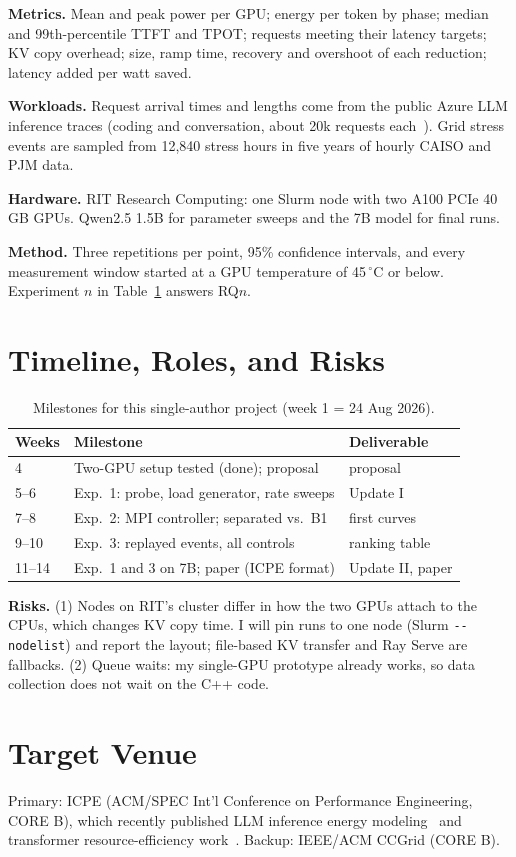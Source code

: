 \documentclass[conference,10pt]{IEEEtran}
\begin{document}
\textbf{Metrics.} Mean and peak power per GPU; energy per token by phase; median and 99th-percentile TTFT and TPOT; requests meeting their latency targets; KV copy overhead; size, ramp time, recovery and overshoot of each reduction; latency added per watt saved.

\textbf{Workloads.} Request arrival times and lengths come from the public Azure LLM inference traces (coding and conversation, about 20k requests each~\cite{patel2024splitwise}). Grid stress events are sampled from 12{,}840 stress hours in five years of hourly CAISO and PJM data.

\textbf{Hardware.} RIT Research Computing: one Slurm node with two A100 PCIe 40\,GB GPUs. Qwen2.5 1.5B for parameter sweeps and the 7B model for final runs.

\textbf{Method.} Three repetitions per point, 95\% confidence intervals, and every measurement window started at a GPU temperature of 45\,$^\circ$C or below. Experiment $n$ in Table~\ref{tab:timeline} answers RQ$n$.

\section{Timeline, Roles, and Risks}
\begin{table}[!h]
\centering\footnotesize
\begin{tabular}{@{}lll@{}}
\toprule
Weeks & Milestone & Deliverable\\
\midrule
4 & Two-GPU setup tested (done); proposal & proposal\\
5--6 & Exp.\ 1: probe, load generator, rate sweeps & Update I\\
7--8 & Exp.\ 2: MPI controller; separated vs.\ B1 & first curves\\
9--10 & Exp.\ 3: replayed events, all controls & ranking table\\
11--14 & Exp.\ 1 and 3 on 7B; paper (ICPE format) & Update II, paper\\
\bottomrule
\end{tabular}
\caption{Milestones for this single-author project (week 1 = 24 Aug 2026).}\label{tab:timeline}
\end{table}

\textbf{Risks.} (1) Nodes on RIT's cluster differ in how the two GPUs attach to the CPUs, which changes KV copy time. I will pin runs to one node (Slurm \texttt{-{}-nodelist}) and report the layout; file-based KV transfer and Ray Serve are fallbacks. (2) Queue waits: my single-GPU prototype already works, so data collection does not wait on the C++ code.

\section{Target Venue}
Primary: ICPE (ACM/SPEC Int'l Conference on Performance Engineering, CORE B), which recently published LLM inference energy modeling~\cite{cavagna2026sweetspot} and transformer resource-efficiency work~\cite{wallace2025icpe}. Backup: IEEE/ACM CCGrid (CORE B).



\end{document}

